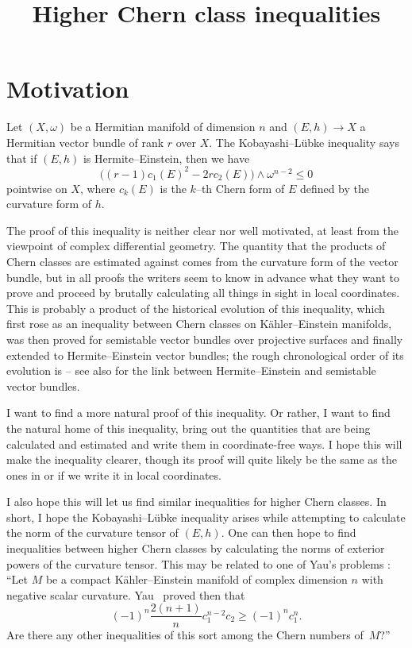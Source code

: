 \documentclass[11pt,a4paper]{amsart}
\title{Higher Chern class inequalities}
\theoremstyle{definition}
\numberwithin{equation}{section}
\begin{document}
\maketitle 



\section*{Motivation}

Let $(X,\omega)$ be a Hermitian manifold of dimension $n$ and $(E,h) \to X$
a Hermitian vector bundle of rank $r$ over $X$. The Kobayashi--L\"{u}bke
inequality says that if $(E,h)$ is Hermite--Einstein, then we have
$$
\bigl((r-1)c_1(E)^2 - 2rc_2(E)\bigr) \wedge \omega^{n-2} \leq 0
$$
pointwise on $X$, where $c_k(E)$ is the $k$--th Chern form of $E$ defined by the curvature form of $h$.

The proof of this inequality is neither clear nor well motivated, at
least from the viewpoint of complex differential geometry. The quantity
that the products of Chern classes are estimated against comes from the
curvature form of the vector bundle, but in all proofs the writers seem
to know in advance what they want to prove and proceed by brutally
calculating all things in sight in local coordinates. This is probably a
product of the historical evolution of this inequality, which first rose as
an inequality between Chern classes on K\"ahler--Einstein manifolds, was
then proved for semistable vector bundles over projective surfaces and
finally extended to Hermite--Einstein vector bundles; the rough
chronological order of its evolution is
\cite{Chen-Ogiue,Miyaoka,Bogomolov,Gieseker,Lubke} -- see also
\cite{Kobayashi,LubkeStab,Siu} for the link between Hermite--Einstein
and semistable vector bundles.

I want to find a more natural proof of this inequality. Or rather, I want
to find the natural home of this inequality, bring out the quantities
that are being calculated and estimated and write them in coordinate-free
ways. I hope this will make the inequality clearer, though its proof will
quite likely be the same as the ones in \cite{Chen-Ogiue} or \cite{Lubke}
if we write it in local coordinates.

I also hope this will let us find similar inequalities for higher Chern
classes. In short, I hope the Kobayashi--L\"{u}bke inequality arises while
attempting to calculate the norm of the curvature tensor of $(E,h)$. One can
then hope to find inequalities between higher Chern classes by calculating
the norms of exterior powers of the curvature tensor. This may be related
to one of Yau's problems \cite[Problem~45]{Yau}: ``Let $M$ be a compact
K\"{a}hler--Einstein manifold of complex dimension $n$ with negative scalar
curvature. Yau~\cite{Yau2} proved then that
$$
(-1)^n \frac{2(n+1)}{n} c_1^{n-2} c_2 \geq (-1)^n c_1^n.
$$
Are there any other inequalities of this sort among the Chern numbers
of~$M$?''%
\end{document}
